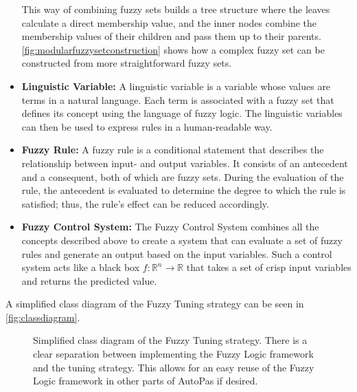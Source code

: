 \begin{itemize}
        This way of combining fuzzy sets builds a tree structure where the leaves calculate a direct membership value, and the inner nodes combine the membership values of their children and pass them up to their parents. \autoref{fig:modularfuzzysetconstruction} shows how a complex fuzzy set can be constructed from more straightforward fuzzy sets.

  \item \textbf{Linguistic Variable:} A linguistic variable is a variable whose values are terms in a natural language. Each term is associated with a fuzzy set that defines its concept using the language of fuzzy logic. The linguistic variables can then be used to express rules in a human-readable way.

  \item \textbf{Fuzzy Rule:} A fuzzy rule is a conditional statement that describes the relationship between input- and output variables. It consists of an antecedent and a consequent, both of which are fuzzy sets. During the evaluation of the rule, the antecedent is evaluated to determine the degree to which the rule is satisfied; thus, the rule's effect can be reduced accordingly.

  \item \textbf{Fuzzy Control System:} The Fuzzy Control System combines all the concepts described above to create a system that can evaluate a set of fuzzy rules and generate an output based on the input variables. Such a control system acts like a black box $f: \mathbb{R}^n \rightarrow \mathbb{R}$ that takes a set of crisp input variables and returns the predicted value.
\end{itemize}

A simplified class diagram of the Fuzzy Tuning strategy can be seen in \autoref{fig:classdiagram}.

\begin{figure}[h]
  \centering
  
  \caption[Class diagram of the Fuzzy Tuning Strategy]{Simplified class diagram of the Fuzzy Tuning strategy. There is a clear separation between implementing the Fuzzy Logic framework and the tuning strategy. This allows for an easy reuse of the Fuzzy Logic framework in other parts of AutoPas if desired.}
  \label{fig:classdiagram}
\end{figure}


